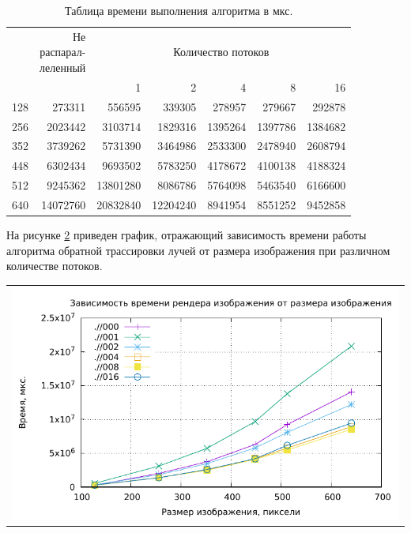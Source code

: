 \begin{table}[H]
	\begin{center}
		\caption{\label{tbl:profilingalgs1} Таблица времени выполнения алгоритма в мкс.}
		\begin{tabular}{|c|r|r|r|r|r|r|}
			\hline
			\specialcell{$S$} &  \specialcell{Не\\ распарал-\\леленный}    & \multicolumn{5}{c|}{Количество потоков}\\
			\cline{3-7}
			&   &1&2& 4&8&16\\ 
			
			\hline
			128 & \num{273311} & \num{556595} & \num{339305} & \num{278957} & \num{279667} & \num{292878} \\ \hline
			256 & \num{2023442} & \num{3103714} & \num{1829316} & \num{1395264} & \num{1397786} & \num{1384682} \\ \hline
			352 & \num{3739262} & \num{5731390} & \num{3464986} & \num{2533300} & \num{2478940} & \num{2608794}\\ \hline
			448 & \num{6302434} & \num{9693502} & \num{5783250} & \num{4178672} & \num{4100138} & \num{4188324} \\ \hline
			512 & \num{9245362} & \num{13801280} & \num{8086786} & \num{5764098} & \num{5463540} & \num{6166600} \\ \hline
			640 & \num{14072760} & \num{20832840} & \num{12204240} & \num{8941954} & \num{8551252} & \num{9452858} \\ \hline
			
			
			
		\end{tabular}
	\end{center}
\end{table}

На рисунке \ref{img:plot} приведен график, отражающий зависимость
времени работы алгоритма обратной трассировки лучей от размера изображения при различном количестве потоков.

\begin{table}[H]
	\centering
	\begin{tabular}{p{1\linewidth}}
		\centering
		\includegraphics[width=0.81\linewidth]{include/plot.pdf}
		\captionof{figure}{Зависимость
			времени работы алгоритма обратной трассировки лучей от размера изображения при различном количестве потоков}
		\label{img:plot}
	\end{tabular}
\end{table}


